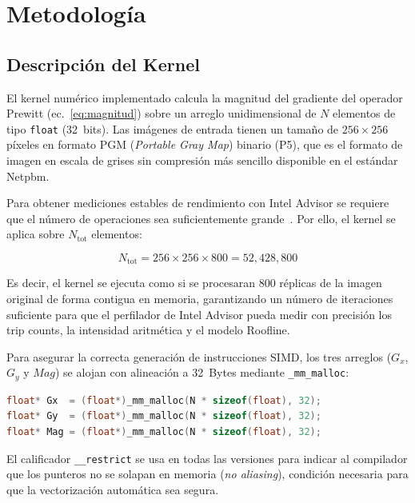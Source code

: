 \section{Metodolog\'ia}

\subsection{Descripci\'on del Kernel}

El kernel num\'erico implementado calcula la magnitud del
gradiente del operador Prewitt (ec.~\ref{eq:magnitud}) sobre
un arreglo unidimensional de $N$ elementos de tipo
\texttt{float} (32~bits).
Las im\'agenes de entrada tienen un tama\~no de $256 \times 256$
p\'ixeles en formato PGM (\textit{Portable Gray Map}) binario
(P5), que es el formato de imagen en escala de grises sin
compresi\'on m\'as sencillo disponible en el est\'andar Netpbm.

Para obtener mediciones estables de rendimiento con Intel Advisor
se requiere que el n\'umero de operaciones sea suficientemente
grande~\cite{intel_advisor}.
Por ello, el kernel se aplica sobre $N_{\text{tot}}$ elementos:

\begin{equation}
  N_{\text{tot}} = 256 \times 256 \times 800 = 52{,}428{,}800
  \label{eq:ntot}
\end{equation}

Es decir, el kernel se ejecuta como si se procesaran 800 r\'eplicas
de la imagen original de forma contigua en memoria, garantizando
un n\'umero de iteraciones suficiente para que el perfilador
de Intel Advisor pueda medir con precisi\'on los trip counts,
la intensidad aritm\'etica y el modelo Roofline.

Para asegurar la correcta generaci\'on de instrucciones SIMD,
los tres arreglos ($G_x$, $G_y$ y $\textit{Mag}$) se alojan con
alineaci\'on a 32~Bytes mediante \texttt{\_mm\_malloc}:

\begin{lstlisting}[language=C++,caption={Alocaci\'on alineada de arreglos.}]
float* Gx  = (float*)_mm_malloc(N * sizeof(float), 32);
float* Gy  = (float*)_mm_malloc(N * sizeof(float), 32);
float* Mag = (float*)_mm_malloc(N * sizeof(float), 32);
\end{lstlisting}

El calificador \texttt{\_\_restrict} se usa en todas las versiones
para indicar al compilador que los punteros no se solapan en
memoria (\textit{no aliasing}), condici\'on necesaria para que
la vectorizaci\'on autom\'atica sea segura.

